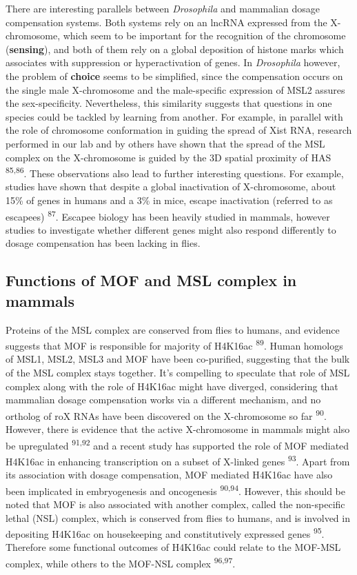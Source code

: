 \documentclass[11pt,twoside]{MPIthesis}
\theoremstyle{definition}
\theoremstyle{definition}
\theoremstyle{definition}
\theoremstyle{remark}
\begin{document}
There are interesting parallels between \emph{Drosophila} and mammalian
dosage compensation systems. Both systems rely on an lncRNA expressed
from the X-chromosome, which seem to be important for the recognition of
the chromosome (\textbf{sensing}), and both of them rely on a global
deposition of histone marks which associates with suppression or
hyperactivation of genes. In \emph{Drosophila} however, the problem of
\textbf{choice} seems to be simplified, since the compensation occurs on
the single male X-chromosome and the male-specific expression of MSL2
assures the sex-specificity. Nevertheless, this similarity suggests that
questions in one species could be tackled by learning from another. For
example, in parallel with the role of chromosome conformation in guiding
the spread of Xist RNA, research performed in our lab and by others have
shown that the spread of the MSL complex on the X-chromosome is guided
by the 3D spatial proximity of HAS \textsuperscript{85,86}. These
observations also lead to further interesting questions. For example,
studies have shown that despite a global inactivation of X-chromosome,
about 15\% of genes in humans and a 3\% in mice, escape inactivation
(referred to as escapees) \textsuperscript{87}. Escapee biology has been
heavily studied in mammals, however studies to investigate whether
different genes might also respond differently to dosage compensation
has been lacking in flies.

\subsection{Functions of MOF and MSL complex in
mammals}\label{functions-of-mof-and-msl-complex-in-mammals}

Proteins of the MSL complex are conserved from flies to humans, and
evidence suggests that MOF is responsible for majority of H4K16ac
\textsuperscript{89}. Human homologs of MSL1, MSL2, MSL3 and MOF have
been co-purified, suggesting that the bulk of the MSL complex stays
together. It's compelling to speculate that role of MSL complex along
with the role of H4K16ac might have diverged, considering that mammalian
dosage compensation works via a different mechanism, and no ortholog of
roX RNAs have been discovered on the X-chromosome so far
\textsuperscript{90}. However, there is evidence that the active
X-chromosome in mammals might also be upregulated
\textsuperscript{91,92} and a recent study has supported the role of MOF
mediated H4K16ac in enhancing transcription on a subset of X-linked
genes \textsuperscript{93}. Apart from its association with dosage
compensation, MOF mediated H4K16ac have also been implicated in
embryogenesis and oncogenesis \textsuperscript{90,94}. However, this
should be noted that MOF is also associated with another complex, called
the non-specific lethal (NSL) complex, which is conserved from flies to
humans, and is involved in depositing H4K16ac on housekeeping and
constitutively expressed genes \textsuperscript{95}. Therefore some
functional outcomes of H4K16ac could relate to the MOF-MSL complex,
while others to the MOF-NSL complex \textsuperscript{96,97}.
\end{document}
